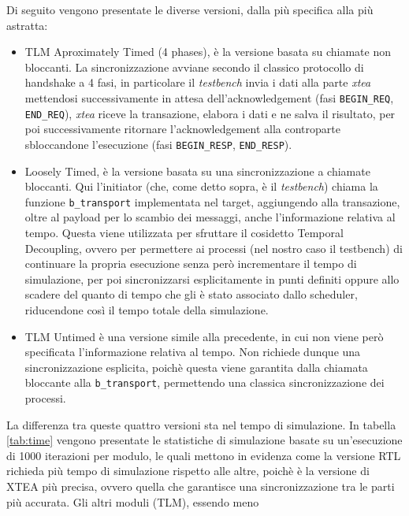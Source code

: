 \documentclass[]{IEEEtran}
\newcommand{\code}[1]{\texttt{#1}}
\begin{document}
\begin{itemize}
    Di seguito vengono presentate le diverse versioni, dalla pi\`u specifica alla pi\`u astratta:
    \begin{itemize}
        \item TLM Aproximately Timed (4 phases), è la versione basata su chiamate non bloccanti. La sincronizzazione 
        avviane secondo il classico protocollo di handshake a 4 fasi, in particolare il \emph{testbench} invia i dati 
        alla parte \emph{xtea} mettendosi successivamente in attesa dell'acknowledgement (fasi \code{BEGIN\_REQ}, 
        \code{END\_REQ}), \emph{xtea} riceve la transazione, elabora i dati e ne salva il risultato, per poi successivamente 
        ritornare l'acknowledgement alla controparte sbloccandone l'esecuzione (fasi \code{BEGIN\_RESP}, 
        \code{END\_RESP}).
        \item Loosely Timed, \`e la versione basata su una sincronizzazione a chiamate bloccanti. Qui l'initiator (che, 
        come detto sopra, è il \emph{testbench}) chiama la funzione \code{b\_transport} implementata nel target, 
        aggiungendo alla transazione, oltre al payload per lo scambio dei messaggi, anche l'informazione relativa al 
        tempo. Questa viene utilizzata per sfruttare il cosidetto Temporal Decoupling, ovvero per permettere ai processi 
        (nel nostro caso il testbench) di continuare la propria esecuzione senza per\`o incrementare il tempo di 
        simulazione, per poi sincronizzarsi esplicitamente in punti definiti oppure allo scadere del quanto di tempo 
        che gli è stato associato dallo scheduler, riducendone cos\`i il tempo totale della simulazione.
        \item TLM Untimed \`e una versione simile alla precedente, in cui non viene per\`o specificata l'informazione 
        relativa al tempo. Non richiede dunque una sincronizzazione esplicita, poich\`e questa viene garantita dalla 
        chiamata bloccante alla \code{b\_transport}, permettendo una classica sincronizzazione dei processi.
    \end{itemize}
\end{itemize}
La differenza tra queste quattro versioni sta nel tempo di simulazione. In tabella \ref{tab:time} vengono presentate le 
statistiche di simulazione basate su un'esecuzione di 1000 iterazioni per modulo, le quali mettono in evidenza come la 
versione RTL richieda più tempo di simulazione rispetto alle altre, poich\`e \`e la versione di XTEA pi\`u precisa, 
ovvero quella che garantisce una sincronizzazione tra le parti pi\`u accurata. Gli altri moduli (TLM), essendo meno 
\end{document}
